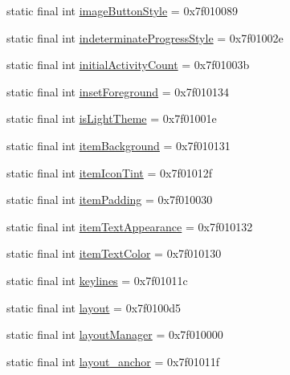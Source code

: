 \begin{CompactItemize}
static final int \hyperlink{classandroid_1_1support_1_1v7_1_1recyclerview_1_1_r_1_1attr_e1d2e56accb0c06ac0e707e8b9a6fb06}{imageButtonStyle} = 0x7f010089
\item 
static final int \hyperlink{classandroid_1_1support_1_1v7_1_1recyclerview_1_1_r_1_1attr_830a6af106245e3ddd6db3b9662a913c}{indeterminateProgressStyle} = 0x7f01002e
\item 
static final int \hyperlink{classandroid_1_1support_1_1v7_1_1recyclerview_1_1_r_1_1attr_8daf1058bc756fd13cb2b6539c3c7692}{initialActivityCount} = 0x7f01003b
\item 
static final int \hyperlink{classandroid_1_1support_1_1v7_1_1recyclerview_1_1_r_1_1attr_4de2c41d484c3a4bed4dc99488aff179}{insetForeground} = 0x7f010134
\item 
static final int \hyperlink{classandroid_1_1support_1_1v7_1_1recyclerview_1_1_r_1_1attr_875053021b0011652dcde16d72ba8e44}{isLightTheme} = 0x7f01001e
\item 
static final int \hyperlink{classandroid_1_1support_1_1v7_1_1recyclerview_1_1_r_1_1attr_f84c2f15e277a8421048d0079667be9e}{itemBackground} = 0x7f010131
\item 
static final int \hyperlink{classandroid_1_1support_1_1v7_1_1recyclerview_1_1_r_1_1attr_c36cdab9e882429726f7499b28d40323}{itemIconTint} = 0x7f01012f
\item 
static final int \hyperlink{classandroid_1_1support_1_1v7_1_1recyclerview_1_1_r_1_1attr_d743ec77b8451a294b043c0b7be6effc}{itemPadding} = 0x7f010030
\item 
static final int \hyperlink{classandroid_1_1support_1_1v7_1_1recyclerview_1_1_r_1_1attr_7bf49d7d55ac44e46f470ce946412a1f}{itemTextAppearance} = 0x7f010132
\item 
static final int \hyperlink{classandroid_1_1support_1_1v7_1_1recyclerview_1_1_r_1_1attr_24fcc15f2464d4ce3610946c35017749}{itemTextColor} = 0x7f010130
\item 
static final int \hyperlink{classandroid_1_1support_1_1v7_1_1recyclerview_1_1_r_1_1attr_6e5e66cc40cebca6f951bb7b9886e2bc}{keylines} = 0x7f01011c
\item 
static final int \hyperlink{classandroid_1_1support_1_1v7_1_1recyclerview_1_1_r_1_1attr_1b68afa3d9efed4db4b4035d66052220}{layout} = 0x7f0100d5
\item 
static final int \hyperlink{classandroid_1_1support_1_1v7_1_1recyclerview_1_1_r_1_1attr_86979bbfa68a95adf098fa15628e6d8e}{layoutManager} = 0x7f010000
\item 
static final int \hyperlink{classandroid_1_1support_1_1v7_1_1recyclerview_1_1_r_1_1attr_8119ca28ef1636398a40c2d56e3d2e59}{layout\_\-anchor} = 0x7f01011f

\end{CompactItemize}
